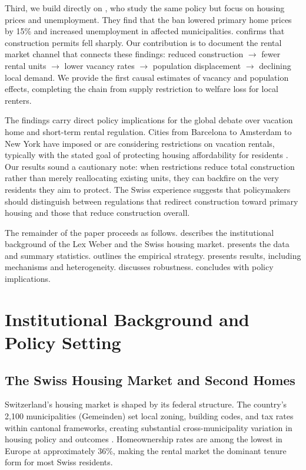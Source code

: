 \documentclass[12pt]{article}
\begin{document}
Third, we build directly on \citet{hilber2020economic}, who study the same policy but focus on housing prices and unemployment. They find that the ban lowered primary home prices by 15\% and increased unemployment in affected municipalities. \citet{deville2022restricting} confirms that construction permits fell sharply. Our contribution is to document the rental market channel that connects these findings: reduced construction $\rightarrow$ fewer rental units $\rightarrow$ lower vacancy rates $\rightarrow$ population displacement $\rightarrow$ declining local demand. We provide the first causal estimates of vacancy and population effects, completing the chain from supply restriction to welfare loss for local renters.

The findings carry direct policy implications for the global debate over vacation home and short-term rental regulation. Cities from Barcelona to Amsterdam to New York have imposed or are considering restrictions on vacation rentals, typically with the stated goal of protecting housing affordability for residents \citep{almagro2024short}. Our results sound a cautionary note: when restrictions reduce total construction rather than merely reallocating existing units, they can backfire on the very residents they aim to protect. The Swiss experience suggests that policymakers should distinguish between regulations that redirect construction toward primary housing and those that reduce construction overall.

The remainder of the paper proceeds as follows.  describes the institutional background of the Lex Weber and the Swiss housing market.  presents the data and summary statistics.  outlines the empirical strategy.  presents results, including mechanisms and heterogeneity.  discusses robustness.  concludes with policy implications.


\section{Institutional Background and Policy Setting}
\label{sec:background}

\subsection{The Swiss Housing Market and Second Homes}

Switzerland's housing market is shaped by its federal structure. The country's 2,100 municipalities (Gemeinden) set local zoning, building codes, and tax rates within cantonal frameworks, creating substantial cross-municipality variation in housing policy and outcomes \citep{parchet2019culture, brulhart2012agglomeration}. Homeownership rates are among the lowest in Europe at approximately 36\%, making the rental market the dominant tenure form for most Swiss residents.
\end{document}
